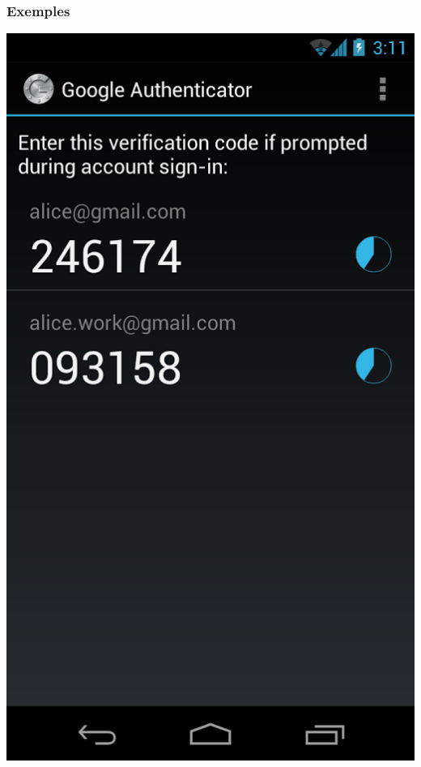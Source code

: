 \documentclass[xcolor=table]{beamer}
\begin{document}
\begin{frame}
\frametitle{Exemples}
\begin{center}
\includegraphics[scale=0.2]{../graphics/googleauth.png}
\hspace{1em}

\end{center}
\end{frame}
\end{document}
